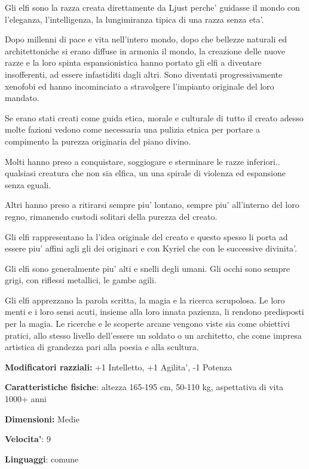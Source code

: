 \documentclass[a4paper,11pt,twoside,openany]{book}
\begin{document}
	\label{elfi}
	
	Gli elfi sono la razza creata direttamente da Ljust perche' guidasse il mondo con l'eleganza, l'intelligenza, la lungimiranza tipica di una razza senza eta'.
	
	Dopo millenni di pace e vita nell'intero mondo, dopo che bellezze naturali ed architettoniche si erano diffuse in armonia il mondo, la creazione delle nuove razze e la loro spinta espansionistica hanno portato gli elfi a diventare insofferenti, ad essere infastiditi dagli altri. Sono diventati progressivamente xenofobi ed hanno incominciato a stravolgere l'impianto originale del loro mandato.
	
	Se erano stati creati come guida etica, morale e culturale di tutto il creato adesso molte fazioni vedono come necessaria una pulizia etnica per portare a compimento la purezza originaria del piano divino. 
	
	Molti hanno preso a conquistare, soggiogare e sterminare le razze inferiori.. qualsiasi creatura che non sia elfica, un una spirale di violenza ed espansione senza eguali.
	
	Altri hanno preso a ritirarsi sempre piu' lontano, sempre piu' all'interno del loro regno, rimanendo custodi solitari della purezza del creato. 
	
	Gli elfi rappresentano la l'idea originale del creato e questo spesso li porta ad essere piu' affini agli gli dei originari e con Kyriel che con le successive divinita'.
	
	Gli elfi sono generalmente piu' alti e snelli degli umani. Gli occhi sono sempre grigi, con riflessi metallici, le gambe agili.
	
	Gli elfi apprezzano la parola scritta, la magia e la ricerca scrupolosa. Le loro menti e i loro sensi acuti, insieme alla loro innata pazienza, li rendono predisposti per la magia. Le ricerche e le scoperte arcane vengono viste sia come obiettivi pratici, allo stesso livello dell'essere un soldato o un architetto, che come impresa artistica di grandezza pari alla poesia e alla scultura.
	
	\textbf{Modificatori razziali:} +1 Intelletto, +1 Agilita', -1 Potenza
	
	\textbf{Caratteristiche fisiche}: altezza 165-195 cm, 50-110 kg, aspettativa
	di vita 1000+ anni
	
	\textbf{Dimensioni:} Medie
	
	\textbf{Velocita'}: 9
	
	\textbf{Linguaggi}: comune
	
\end{document}
